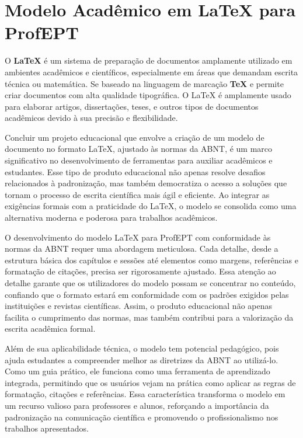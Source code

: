 \section{Modelo Acadêmico em LaTeX para ProfEPT}


O \textbf{LaTeX} é um sistema de preparação de documentos amplamente utilizado em ambientes acadêmicos e científicos, especialmente em áreas que demandam escrita técnica ou matemática. Se baseado na linguagem de marcação \textbf{TeX} e permite criar documentos com alta qualidade tipográfica. O LaTeX é amplamente usado para elaborar artigos, dissertações, teses, e outros tipos de documentos acadêmicos devido à sua precisão e flexibilidade.

Concluir um projeto educacional que envolve a criação de um modelo de documento no formato LaTeX, ajustado às normas da ABNT, é um marco significativo no desenvolvimento de ferramentas para auxiliar acadêmicos e estudantes. Esse tipo de produto educacional não apenas resolve desafios relacionados à padronização, mas também democratiza o acesso a soluções que tornam o processo de escrita científica mais ágil e eficiente. Ao integrar as exigências formais com a praticidade do LaTeX, o modelo se consolida como uma alternativa moderna e poderosa para trabalhos acadêmicos.

O desenvolvimento do modelo LaTeX para ProfEPT com conformidade às normas da ABNT requer uma abordagem meticulosa. Cada detalhe, desde a estrutura básica dos capítulos e sessões até elementos como margens, referências e formatação de citações, precisa ser rigorosamente ajustado. Essa atenção ao detalhe garante que os utilizadores do modelo possam se concentrar no conteúdo, confiando que o formato estará em conformidade com os padrões exigidos pelas instituições e revistas científicas. Assim, o produto educacional não apenas facilita o cumprimento das normas, mas também contribui para a valorização da escrita acadêmica formal.

Além de sua aplicabilidade técnica, o modelo tem potencial pedagógico, pois ajuda estudantes a compreender melhor as diretrizes da ABNT ao utilizá-lo. Como um guia prático, ele funciona como uma ferramenta de aprendizado integrada, permitindo que os usuários vejam na prática como aplicar as regras de formatação, citações e referências. Essa característica transforma o modelo em um recurso valioso para professores e alunos, reforçando a importância da padronização na comunicação científica e promovendo o profissionalismo nos trabalhos apresentados.

